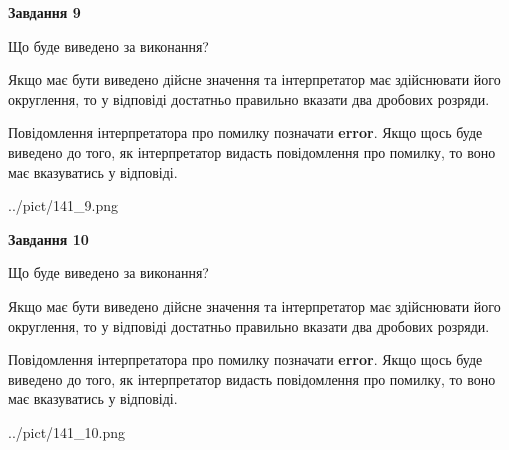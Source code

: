 \documentclass[12pt, ukrainian]{article}
\begin{document}
{\begin {Large}
{\begin {center}\textbf{Завдання 9}\end {center}}\par
Що буде виведено за виконання? \par

Якщо має бути виведено дійсне значення та інтерпретатор має здійснювати його округлення, 
то у відповіді достатньо правильно вказати два дробових розряди.

Повідомлення інтерпретатора про помилку позначати \textbf{error}.
Якщо щось буде виведено до того, як інтерпретатор видасть повідомлення про помилку, 
то воно має вказуватись у відповіді. \par

\begin{center}
	{../pict/141_9.png}
\end{center}
\newpage

{\begin {center}\textbf{Завдання 10}\end {center}}\par
Що буде виведено за виконання? \par

Якщо має бути виведено дійсне значення та інтерпретатор має здійснювати його округлення, 
то у відповіді достатньо правильно вказати два дробових розряди.

Повідомлення інтерпретатора про помилку позначати \textbf{error}.
Якщо щось буде виведено до того, як інтерпретатор видасть повідомлення про помилку, 
то воно має вказуватись у відповіді. \par

\begin{center}
	{../pict/141_10.png}
\end{center}
\newpage

\end {Large}}
\end{document}
